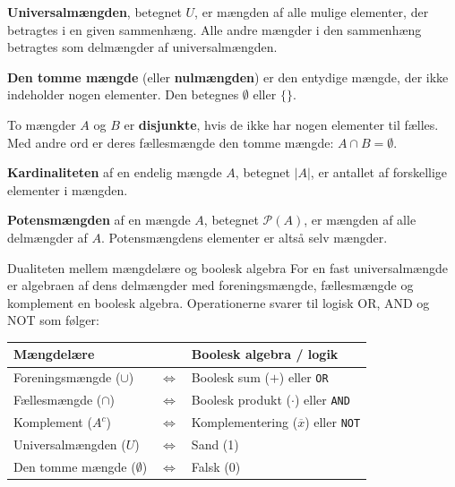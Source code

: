 \begin{definition}[Universalmængde]
    \textbf{Universalmængden}, betegnet $U$, er mængden af alle mulige elementer, der betragtes i en given sammenhæng. Alle andre mængder i den sammenhæng betragtes som delmængder af universalmængden.
\end{definition}

\begin{definition}
    \textbf{Den tomme mængde} (eller \textbf{nulmængden}) er den entydige mængde, der ikke indeholder nogen elementer. Den betegnes $\emptyset$ eller $\{\}$.
\end{definition}

\begin{definition}
    To mængder $A$ og $B$ er \textbf{disjunkte}, hvis de ikke har nogen elementer til fælles. Med andre ord er deres fællesmængde den tomme mængde: $A \cap B = \emptyset$.
\end{definition}

\begin{definition}[Kardinalitet]
    \textbf{Kardinaliteten} af en endelig mængde $A$, betegnet $|A|$, er antallet af forskellige elementer i mængden.
\end{definition}

\begin{definition}[Potensmængde]
    \textbf{Potensmængden} af en mængde $A$, betegnet $\mathcal{P}(A)$, er mængden af alle delmængder af $A$. Potensmængdens elementer er altså selv mængder.
\end{definition}

\begin{custombox}{Dualiteten mellem mængdelære og boolesk algebra}
    For en fast universalmængde er algebraen af dens delmængder med foreningsmængde, fællesmængde og komplement en boolesk algebra. Operationerne svarer til logisk OR, AND og NOT som følger:
    \begin{center}
    \renewcommand{\arraystretch}{1.3}
    \begin{tabular}{lcl}
        \textbf{Mængdelære} & & \textbf{Boolesk algebra / logik} \\
        \hline
        Foreningsmængde ($\cup$) & $\iff$ & Boolesk sum ($+$) eller \texttt{OR} \\
        Fællesmængde ($\cap$) & $\iff$ & Boolesk produkt ($\cdot$) eller \texttt{AND} \\
        Komplement ($A^c$) & $\iff$ & Komplementering ($\overline{x}$) eller \texttt{NOT} \\
        Universalmængden ($U$) & $\iff$ & Sand (1) \\
        Den tomme mængde ($\emptyset$) & $\iff$ & Falsk (0) \\
    \end{tabular}
    \end{center}
\end{custombox}

